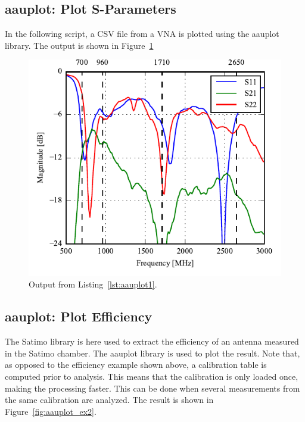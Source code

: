 \subsection{aauplot: Plot S-Parameters}
In the following script, a CSV file from a VNA is plotted using the aauplot library. The output is shown in Figure~\ref{fig:aauplot_ex1}



\begin{figure}[htbp]
    \centering
    \includegraphics{sec/post_processing/examples_aauplot/ex1_sparams.pdf}
    \caption{Output from Listing~\ref{lst:aauplot1}.}
    \label{fig:aauplot_ex1}
\end{figure}

\subsection{aauplot: Plot Efficiency}
The Satimo library is here used to extract the efficiency of an antenna measured in the Satimo chamber. The aauplot library is used to plot the result. Note that, as opposed to the efficiency example shown above, a calibration table is computed prior to analysis. This means that the calibration is only loaded once, making the processing faster. This can be done when several measurements from the same calibration are analyzed. The result is shown in Figure~\ref{fig:aauplot_ex2}.

